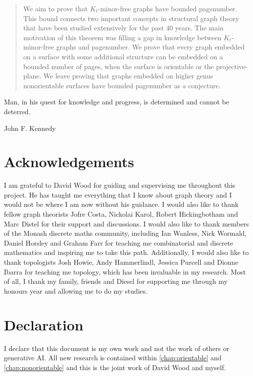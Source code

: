 \begin{abstract}
	We aim to prove that \(K_t\)-minor-free graphs have bounded pagenumber. This bound connects two important concepts in structural graph theory that have been studied extensively for the past 40 years. The main motivation of this theorem was filling a gap in knowledge between $K_t$-minor-free graphs and pagenumber. We prove that every graph embedded on a surface with some additional structure can be embedded on a bounded number of pages, when the surface is orientable or the projective-plane. We leave proving that graphs embedded on higher genus nonorientable surfaces have bounded pagenumber as a conjecture. 
\end{abstract}

\epigraph{Man, in his quest for knowledge and progress, is determined and cannot be deterred.}{John F. Kennedy}
\newpage

\section{Acknowledgements}
I am grateful to David Wood for guiding and supervising me throughout this project. He has taught me everything that I know about graph theory and I would not be where I am now without his guidance. I would also like to thank fellow graph theorists Jofre Costa, Nickolai Karol, Robert Hickingbotham and Marc Distel for their support and discussions. I would also like to thank members of the Monash discrete maths community, including Ian Wanless, Nick Wormald, Daniel Horsley and Graham Farr for teaching me combinatorial and discrete mathematics and inspiring me to take this path. Additionally, I would also like to thank topologists Josh Howie, Andy Hammerlindl, Jessica Purcell and Dionne Ibarra for teaching me topology, which has been invaluable in my research. Most of all, I thank my family, friends and Diesel for supporting me through my honours year and allowing me to do my studies.

\section{Declaration}

I declare that this document is my own work and not the work of others or generative AI. All new research is contained within \cref{chap:orientable} and \cref{chap:nonorientable} and this is the joint work of David Wood and myself.

